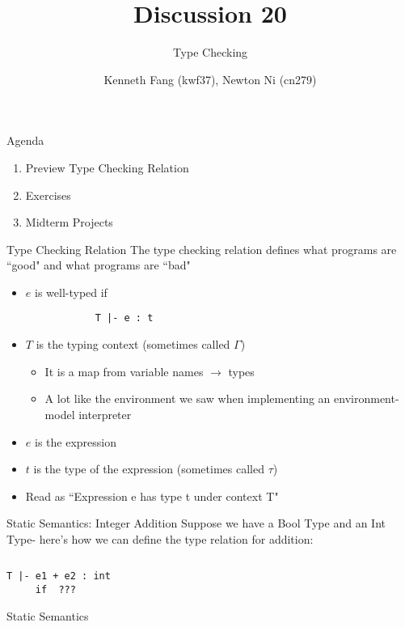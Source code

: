 \documentclass{beamer}
\title{Discussion 20}
\subtitle{Type Checking}
\author{Kenneth Fang (kwf37), Newton Ni (cn279)}
\begin{document}
    \begin{frame}
        \titlepage{}
    \end{frame}
    
    \begin{frame}{Agenda}
    \begin{enumerate}
        \item Preview Type Checking Relation
        \item Exercises
        \item Midterm Projects
    \end{enumerate}
    \end{frame}
    
    \begin{frame}[fragile]{Type Checking Relation}
    The type checking relation defines what programs are ``good" and what programs are ``bad"
        \begin{itemize}
        \item $e$ is well-typed if
        \begin{verbatim}
            T |- e : t
        \end{verbatim}
            \item $T$ is the typing context (sometimes called $\Gamma$)
                \begin{itemize}
                    \item It is a map from variable names $\to$ types
                    \item A lot like the environment we saw when implementing an environment-model interpreter
                \end{itemize}
            \item $e$ is the expression
            \item $t$ is the type of the expression (sometimes called $\tau$)
            \item Read as ``Expression e has type t under context T"
        \end{itemize}
    \end{frame}
    
    \begin{frame}[fragile]{Static Semantics: Integer Addition}
    Suppose we have a Bool Type and an Int Type- here's how we can define the type relation for addition:
    \begin{columns}
        \begin{column}{0.48\textwidth}
\begin{verbatim}
T |- e1 + e2 : int
     if  ???
\end{verbatim}
    Static Semantics
        \end{column}
        \begin{column}{0.48\textwidth}
        \end{column}
    \end{columns}
    \end{frame}
    
\end{document}
